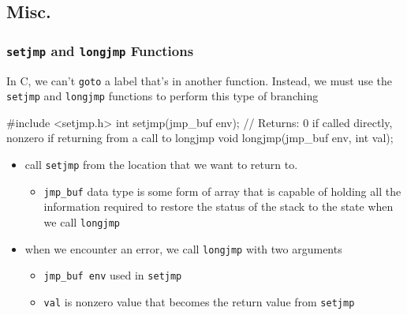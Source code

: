 \documentclass[newPxFont,sthlmFooter,nooffset]{beamer}
\begin{document}
\subsection{Misc.}

\begin{frame}[containsverbatim,t]
  \frametitle{\texttt{setjmp} and \texttt{longjmp} Functions}
In C, we can't \texttt{goto} a label that's in another function. Instead, we must use the \texttt{setjmp} and \texttt{longjmp} functions to perform this type of branching
\begin{codedef}
 #include <setjmp.h>
int setjmp(jmp_buf env);
// Returns: 0 if called directly, nonzero if returning from a call to longjmp
void longjmp(jmp_buf env, int val);
\end{codedef}
\begin{itemize}
\item call \texttt{setjmp} from the location that we want to return to.
  \begin{itemize}
  \item \texttt{jmp\_buf} data type is some form of array that is capable of holding all the information required to restore the status of the stack to the state when we call \texttt{longjmp}
  \end{itemize}
\item when we encounter an error, we call \texttt{longjmp} with two arguments
  \begin{itemize}
  \item \texttt{jmp\_buf env} used in \texttt{setjmp}
  \item \texttt{val} is nonzero value that becomes the return value from \texttt{setjmp}
  \end{itemize}
\end{itemize}
\end{frame}

\end{document}
